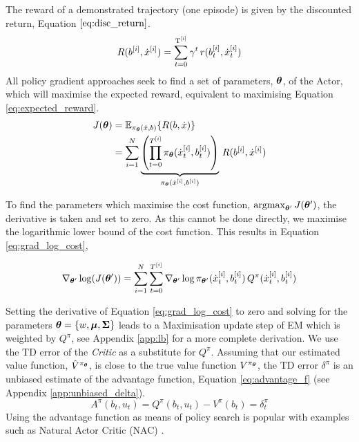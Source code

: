 The reward of a demonstrated trajectory (one episode) is given by the discounted return, Equation $\ref{eq:disc_return}$.
\begin{equation}\label{eq:disc_return}
 R(b^{[i]},\dot{x}^{[i]}) = \sum_{t=0}^{\mathrm{T^{[i]}}} \gamma^t \, r(b^{[i]}_t,\dot{x}^{[i]}_t)
\end{equation}
All policy gradient approaches seek to find a set of parameters, $\boldsymbol{\theta}$, of the Actor,
which will maximise the expected reward, equivalent to maximising Equation \ref{eq:expected_reward}.
\begin{align}\label{eq:expected_reward}
 J(\boldsymbol{\theta}) &= \mathbb{E}_{\pi_{\boldsymbol{\theta}}(\dot{x},b)}\{R(b,\dot{x})\} \nonumber \\
	  &= \sum\limits_{i=1}^{N}   \underbrace{\left( \prod_{t=0}^{T^{[i]}} \pi_{\boldsymbol{\theta}}(\dot{x}^{[i]}_t,b^{[i]}_t) \right)}_{\pi_{\boldsymbol{\theta}}(\dot{x}^{[i]},b^{[i]})} \, R(b^{[i]},\dot{x}^{[i]}) 
\end{align}

To find the parameters which maximise the cost function, $\argmax_{\Param'} J(\Param')$, the derivative is taken and 
set to zero. As this cannot be done directly, we maximise the logarithmic lower bound   
of the cost function. This results in Equation \ref{eq:grad_log_cost},

\begin{equation} \label{eq:grad_log_cost}
    \nabla_{\boldsymbol{\theta}'}\log(J(\boldsymbol{\theta}')) = \sum\limits_{i=1}^{N} \sum\limits_{t=0}^{T^{[i]}} \nabla_{\boldsymbol{\theta}'}\log \pi_{\boldsymbol{\theta}'}(\dot{x}^{[i]}_t,b^{[i]}_t) \, Q^{\pi}(\dot{x}^{[i]}_t,b^{[i]}_t)
\end{equation}

Setting the derivative of Equation \ref{eq:grad_log_cost} to zero and solving for the parameters
$\boldsymbol{\theta}=\{w,\boldsymbol{\mu},\boldsymbol{\Sigma}\}$ leads to a Maximisation update step of EM
which is weighted by $Q^{\pi}$, see Appendix \ref{app:lb} for a more complete derivation.
We use the TD error of the \textit{Critic} as a substitute for $Q^{\pi}$. Assuming that our estimated value function, $\hat{V}^{\pi_{\boldsymbol{\theta}}}$, 
is close to the true value function $V^{\pi_{\boldsymbol{\theta}}}$, the TD error $\delta^{\pi}$ is an unbiased estimate of the advantage function, Equation \ref{eq:advantage_f} 
(see Appendix \ref{app:unbiased_delta}).
\begin{equation}\label{eq:advantage_f}
 A^{\pi}(b_t,u_t) = Q^{\pi}(b_t,u_t) - V^{\pi}(b_t) = \delta^{\pi}_t
\end{equation}
Using the advantage function as means of policy search is popular with examples such as
Natural Actor Critic (NAC) \cite{peter_nac_2008}.

